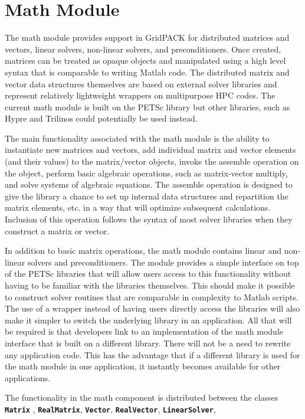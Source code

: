 \section{Math Module}

The math module provides support in GridPACK for distributed matrices and vectors, linear solvers, non-linear solvers, and preconditioners. Once created, matrices can be treated as opaque objects and manipulated using a high level syntax that is comparable to writing Matlab code. The distributed matrix and vector data structures themselves are based on external solver libraries and represent relatively lightweight wrappers on multipurpose HPC codes. The current math module is built on the PETSc library but other libraries, such as Hypre and Trilinos could potentially be used instead.

The main functionality associated with the math module is the ability to instantiate new matrices and vectors, add individual matrix and vector elements (and their values) to the matrix/vector objects, invoke the assemble operation on the object, perform basic algebraic operations, such as matrix-vector multiply, and solve systems of algebraic equations. The assemble operation is designed to give the library a chance to set up internal data structures and repartition the matrix elements, etc. in a way that will optimize subsequent calculations. Inclusion of this operation follows the syntax of most solver libraries when they construct a matrix or vector. 

In addition to basic matrix operations, the math module contains linear and non-linear solvers and preconditioners. The module provides a simple interface on top of the PETSc libraries that will allow users access to this functionality without having to be familiar with the libraries themselves. This should make it possible to construct solver routines that are comparable in complexity to Matlab scripts. The use of a wrapper instead of having users directly access the libraries will also make it simpler to switch the underlying library in an application. All that will be required is that developers link to an implementation of the math module interface that is built on a different library. There will not be a need to rewrite any application code. This has the advantage that if a different library is used for the math module in one application, it instantly becomes available for other applications.

The functionality in the math component is distributed between the classes \texttt{\textbf{Matrix}} , \texttt{\textbf{RealMatrix}}, \texttt{\textbf{Vector}}, \texttt{\textbf{RealVector}}, \texttt{\textbf{LinearSolver}}, 

